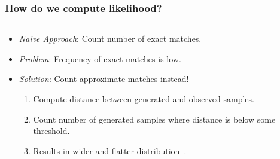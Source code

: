 \documentclass[11pt]{beamer}
\begin{document}
    \begin{frame}
        \frametitle{How do we compute likelihood?}
        \begin{columns}
            \begin{column}{0.6\textwidth}
                \begin{itemize}
                    \item \emph{Naive Approach}: Count number of exact matches. \medskip
                    \item \emph{Problem}: Frequency of exact matches is low. \medskip
                    \item \emph{Solution}: Count approximate matches instead!
                        \begin{enumerate}
                            \item Compute distance between generated and observed samples.
                            \item Count number of generated samples where distance is below some threshold.
                            \item Results in wider and flatter
                                distribution~\cite{lintusaariFundamentalsRecentDevelopments2017}.
                        \end{enumerate}
                \end{itemize}
            \end{column}
            \begin{column}{0.4\textwidth}
                \begin{flushleft}
                    
                \end{flushleft}
            \end{column}
        \end{columns}


\end{frame}
\end{document}
